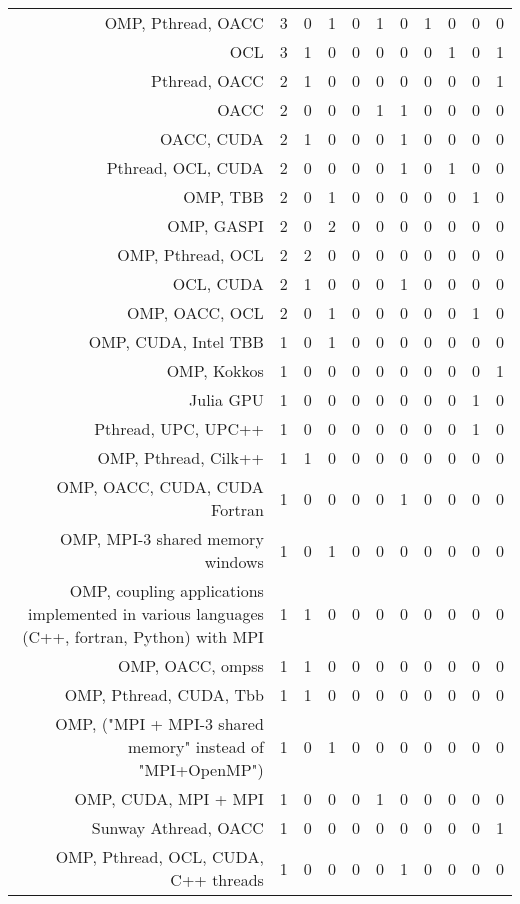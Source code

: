{\begin{landscape}
\begin{longtable}[htb]{r|c|c|c|c|c|c|c|c|c|c}
{OMP, Pthread, OACC} & 3 & 0 & 1 & 0 & 1 & 0 & 1 & 0 & 0 & 0 \\%
{OCL} & 3 & 1 & 0 & 0 & 0 & 0 & 0 & 1 & 0 & 1 \\%
{Pthread, OACC} & 2 & 1 & 0 & 0 & 0 & 0 & 0 & 0 & 0 & 1 \\%
{OACC} & 2 & 0 & 0 & 0 & 1 & 1 & 0 & 0 & 0 & 0 \\%
{OACC, CUDA} & 2 & 1 & 0 & 0 & 0 & 1 & 0 & 0 & 0 & 0 \\%
{Pthread, OCL, CUDA} & 2 & 0 & 0 & 0 & 0 & 1 & 0 & 1 & 0 & 0 \\%
{OMP, TBB} & 2 & 0 & 1 & 0 & 0 & 0 & 0 & 0 & 1 & 0 \\%
{OMP, GASPI} & 2 & 0 & 2 & 0 & 0 & 0 & 0 & 0 & 0 & 0 \\%
{OMP, Pthread, OCL} & 2 & 2 & 0 & 0 & 0 & 0 & 0 & 0 & 0 & 0 \\%
{OCL, CUDA} & 2 & 1 & 0 & 0 & 0 & 1 & 0 & 0 & 0 & 0 \\%
{OMP, OACC, OCL} & 2 & 0 & 1 & 0 & 0 & 0 & 0 & 0 & 1 & 0 \\%
{OMP, CUDA, Intel TBB} & 1 & 0 & 1 & 0 & 0 & 0 & 0 & 0 & 0 & 0 \\%
{OMP, Kokkos} & 1 & 0 & 0 & 0 & 0 & 0 & 0 & 0 & 0 & 1 \\%
{Julia GPU} & 1 & 0 & 0 & 0 & 0 & 0 & 0 & 0 & 1 & 0 \\%
{Pthread, UPC, UPC++} & 1 & 0 & 0 & 0 & 0 & 0 & 0 & 0 & 1 & 0 \\%
{OMP, Pthread, Cilk++} & 1 & 1 & 0 & 0 & 0 & 0 & 0 & 0 & 0 & 0 \\%
{OMP, OACC, CUDA, CUDA Fortran} & 1 & 0 & 0 & 0 & 0 & 1 & 0 & 0 & 0 & 0 \\%
{OMP, MPI-3 shared memory windows} & 1 & 0 & 1 & 0 & 0 & 0 & 0 & 0 & 0 & 0 \\%
{OMP, coupling applications implemented in various languages (C++, fortran, Python) with MPI} & 1 & 1 & 0 & 0 & 0 & 0 & 0 & 0 & 0 & 0 \\%
{OMP, OACC, ompss} & 1 & 1 & 0 & 0 & 0 & 0 & 0 & 0 & 0 & 0 \\%
{OMP, Pthread, CUDA, Tbb} & 1 & 1 & 0 & 0 & 0 & 0 & 0 & 0 & 0 & 0 \\%
{OMP, ("MPI + MPI-3 shared memory" instead of "MPI+OpenMP")} & 1 & 0 & 1 & 0 & 0 & 0 & 0 & 0 & 0 & 0 \\%
{OMP, CUDA, MPI + MPI} & 1 & 0 & 0 & 0 & 1 & 0 & 0 & 0 & 0 & 0 \\%
{Sunway Athread, OACC} & 1 & 0 & 0 & 0 & 0 & 0 & 0 & 0 & 0 & 1 \\%
{OMP, Pthread, OCL, CUDA, C++ threads} & 1 & 0 & 0 & 0 & 0 & 1 & 0 & 0 & 0 & 0 \\%

\end{longtable}
\end{landscape}}
